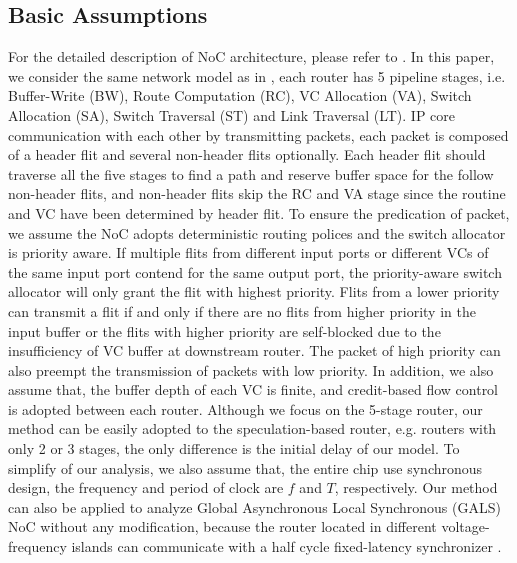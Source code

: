 \documentclass[10pt,journal]{IEEEtran}
\begin{document}
\subsection{Basic Assumptions}
For the detailed description of NoC architecture, please refer to \cite{jerger2009chip}\cite{DaTo04}. In this paper, we consider the same network model as in \cite{627905}\cite{Shi:2008:RCA:1397757.1397996}\cite{707545}\cite{73}, each router has 5 pipeline stages, i.e. Buffer-Write (BW), Route Computation (RC), VC Allocation (VA), Switch Allocation (SA), Switch Traversal (ST) and Link Traversal (LT). IP core communication with each other by transmitting packets, each packet is composed of a header flit and several non-header flits optionally. Each header flit should traverse all the five stages to find a path and reserve buffer space for the follow non-header flits, and non-header flits skip the RC and VA stage since the routine and VC have been determined by header flit. To ensure the predication of packet, we assume the NoC adopts deterministic routing polices and the switch allocator is priority aware. If multiple flits from different input ports or different VCs of the same input port contend for the same output port, the priority-aware switch allocator will only grant the flit with highest priority. Flits from a lower priority can transmit a flit if and only if there are no flits from higher priority in the input buffer or the flits with higher priority are self-blocked due to the insufficiency of VC buffer at downstream router. The packet of high priority can also preempt the transmission of packets with low priority. In addition, we also assume that, the buffer depth of each VC is finite, and credit-based flow control is adopted between each router. Although we focus on the 5-stage router, our method can be easily adopted to the speculation-based router, e.g. routers with only 2 or 3 stages, the only difference is the initial delay of our model. To simplify of our analysis, we also assume that, the entire chip use synchronous design, the frequency and period of clock are $f$ and $T$, respectively. Our method can also be applied to analyze Global Asynchronous Local Synchronous (GALS) NoC without any modification, because the router located in different voltage-frequency islands can communicate with a half cycle fixed-latency synchronizer \cite{5476986}.
\end{document}
